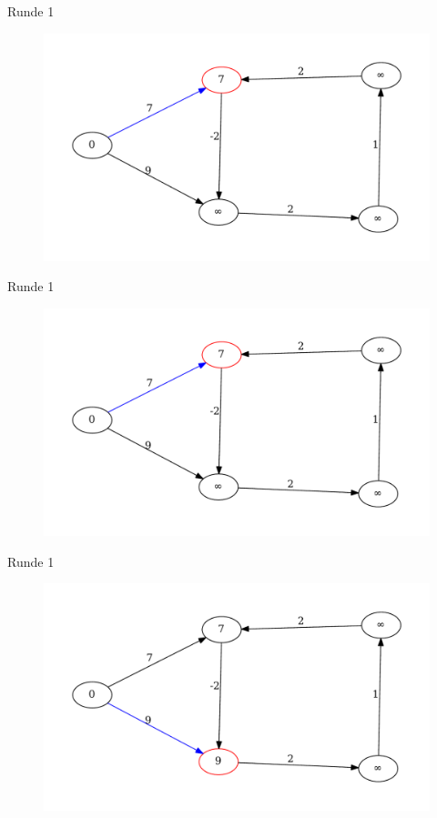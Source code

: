 \begin{frame}{Runde 1}
\begin{figure}[htbp]
\centering
\includegraphics[width=\linewidth]{bellman_ford_graphs/graph_01.pdf}
\end{figure}
\end{frame}
\begin{frame}{Runde 1}
\begin{figure}[htbp]
\centering
\includegraphics[width=\linewidth]{bellman_ford_graphs/graph_01.pdf}
\end{figure}
\end{frame}


\begin{frame}{Runde 1}
\begin{figure}[htbp]
\centering
\includegraphics[width=\linewidth]{bellman_ford_graphs/graph_02.pdf}
\end{figure}
\end{frame}

